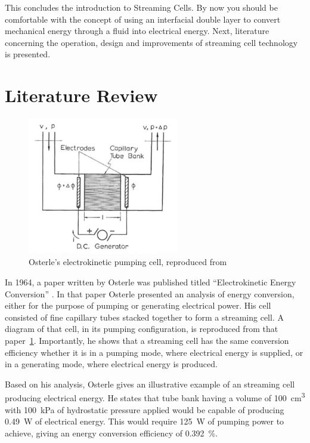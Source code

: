     This concludes the introduction to Streaming Cells.
    By now you should be comfortable with the concept of using an interfacial double layer to convert mechanical energy through a fluid into electrical energy.
    Next, literature concerning the operation, design and improvements of streaming cell technology is presented.

  \section{Literature Review}

    \begin{figure}
      \centering
      \includegraphics[height=6cm]{content/pt1/Osterle_ElectrokineticCell.png}
      \caption{\label{fig:Osterle_cell}Osterle's electrokinetic pumping cell, reproduced from \cite{Osterle1964}}
    \end{figure}

    In 1964, a paper written by Osterle was published titled ``Electrokinetic Energy Conversion'' \cite{Osterle1964}.
    In that paper Osterle presented an analysis of energy conversion, either for the purpose of pumping or generating electrical power.
    His cell consisted of fine capillary tubes stacked together to form a streaming cell.
    A diagram of that cell, in its pumping configuration, is reproduced from that paper~\cref{fig:Osterle_cell}.
    Importantly, he shows that a streaming cell has the same conversion efficiency whether it is in a pumping mode, where electrical energy is supplied, or in a generating mode, where electrical energy is produced.

    Based on his analysis, Osterle gives an illustrative example of an streaming cell producing electrical energy.
    He states that tube bank having a volume of \SI{100}{\centi\meter\cubed} with \SI{100}{\kilo\pascal} of hydrostatic pressure applied would be capable of producing \SI{0.49}{\watt} of electrical energy.
    This would require \SI{125}{\watt} of pumping power to achieve, giving an energy conversion efficiency of \SI{0.392}{\percent}.

